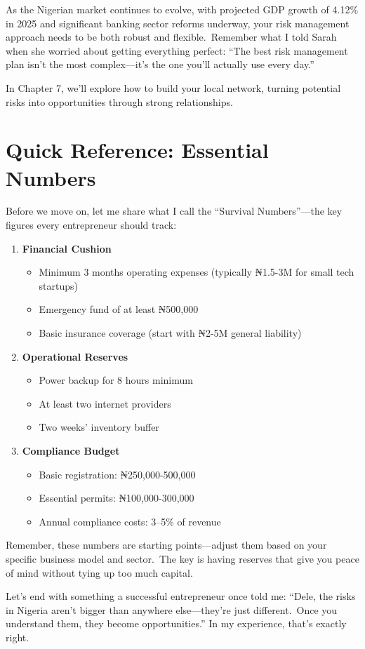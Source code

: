 \begin{importantbox}
As the Nigerian market continues to evolve, with projected GDP growth of 4.12\% in 2025 and significant banking sector reforms underway, your risk management approach needs to be both robust and flexible.\ Remember what I told Sarah when she worried about getting everything perfect: ``The best risk management plan isn't the most complex—it's the one you'll actually use every day.''

In Chapter 7, we'll explore how to build your local network, turning potential risks into opportunities through strong relationships.
\end{importantbox}

\section{Quick Reference: Essential Numbers}\label{sec:quick-reference}

Before we move on, let me share what I call the ``Survival Numbers''—the key figures every entrepreneur should track:

\begin{enumerate}
    \item \textbf{Financial Cushion}
    \begin{itemize}
        \item Minimum 3 months operating expenses (typically ₦1.5-3M for small tech startups)
        \item Emergency fund of at least ₦500,000
        \item Basic insurance coverage (start with ₦2-5M general liability)
    \end{itemize}

    \item \textbf{Operational Reserves}
    \begin{itemize}
        \item Power backup for 8 hours minimum
        \item At least two internet providers
        \item Two weeks' inventory buffer
    \end{itemize}

    \item \textbf{Compliance Budget}
    \begin{itemize}
        \item Basic registration: ₦250,000-500,000
        \item Essential permits: ₦100,000-300,000
        \item Annual compliance costs: 3--5\% of revenue
    \end{itemize}
\end{enumerate}

Remember, these numbers are starting points—adjust them based on your specific business model and sector.\ The key is having reserves that give you peace of mind without tying up too much capital.

Let's end with something a successful entrepreneur once told me: ``Dele, the risks in Nigeria aren't bigger than anywhere else—they're just different.\ Once you understand them, they become opportunities.'' In my experience, that's exactly right.
